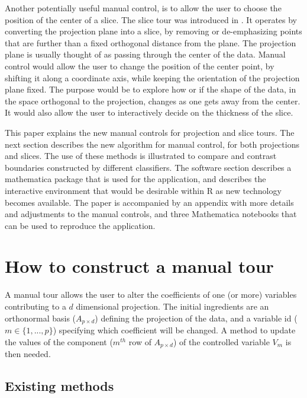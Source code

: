 \documentclass[]{interact}
\theoremstyle{plain}%
\theoremstyle{definition}
\theoremstyle{remark}
\begin{document}
Another potentially useful manual control, is to allow the user to
choose the position of the center of a slice. The slice tour was
introduced in \citet{slicetour}. It operates by converting the
projection plane into a slice, by removing or de-emphasizing points that
are further than a fixed orthogonal distance from the plane. The
projection plane is usually thought of as passing through the center of
the data. Manual control would allow the user to change the position of
the center point, by shifting it along a coordinate axis, while keeping
the orientation of the projection plane fixed. The purpose would be to
explore how or if the shape of the data, in the space orthogonal to the
projection, changes as one gets away from the center. It would also
allow the user to interactively decide on the thickness of the slice.

This paper explains the new manual controls for projection and slice
tours. The next section describes the new algorithm for manual control,
for both projections and slices. The use of these methods is illustrated
to compare and contrast boundaries constructed by different classifiers.
The software section describes a mathematica package that is used for
the application, and describes the interactive environment that would be
desirable within R as new technology becomes available. The paper is
accompanied by an appendix with more details and adjustments to the
manual controls, and three Mathematica notebooks that can be used to
reproduce the application.

\hypertarget{sec:method}{%
\section{How to construct a manual tour}\label{sec:method}}

A manual tour allows the user to alter the coefficients of one (or more)
variables contributing to a \(d\) dimensional projection. The initial
ingredients are an orthonormal basis (\(A_{p\times d}\)) defining the
projection of the data, and a variable id (\(m \in \{1, ..., p\}\))
specifying which coefficient will be changed. A method to update the
values of the component (\(m^{th}\) row of \(A_{p\times d}\)) of the
controlled variable \(V_m\) is then needed.

\hypertarget{existing-methods}{%
\subsection{Existing methods}\label{existing-methods}}
\end{document}
